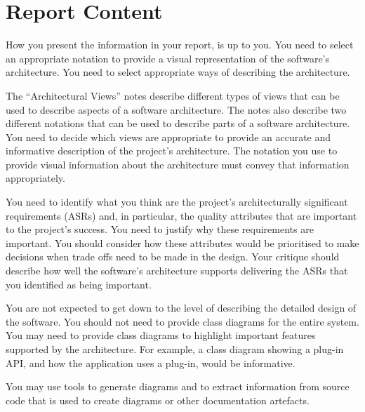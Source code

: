 \documentclass{csse4400}
\begin{document}
\section{Report Content}
How you present the information in your report, is up to you. You need to select an appropriate notation 
to provide a visual representation of the software's architecture. You need to select appropriate ways of describing
the architecture.

The ``Architectural Views'' notes describe different types of views that can be used to describe aspects of a software architecture.
The notes also describe two different notations that can be used to describe parts of a software architecture.
You need to decide which views are appropriate to provide an accurate and informative description of the project's architecture.
The notation you use to provide visual information about the architecture must convey that information appropriately.

You need to identify what you think are the project's architecturally significant requirements (ASRs)
and, in particular, the quality attributes that are important to the project's success.
You need to justify why these requirements are important.
You should consider how these attributes would be prioritised to make decisions when trade offs need to be made in the design.
Your critique should describe how well the software's architecture supports delivering the ASRs that you identified as being important.

You are not expected to get down to the level of describing the detailed design of the software.
You should not need to provide class diagrams for the entire system.
You may need to provide class diagrams to highlight important features supported by the architecture.
For example, a class diagram showing a plug-in API, and how the application uses a plug-in, would be informative.

You may use tools to generate diagrams and to extract information from source code that is used to create diagrams or other documentation artefacts.

\end{document}
